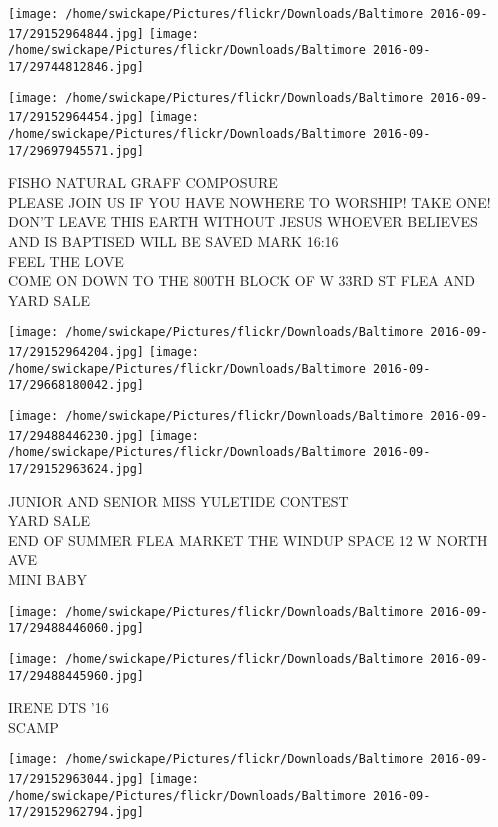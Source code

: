 \documentclass[10pt,letterpaper]{article}
\begin{document}
\texttt{[image: /home/swickape/Pictures/flickr/Downloads/Baltimore 2016-09-17/29152964844.jpg]}
\texttt{[image: /home/swickape/Pictures/flickr/Downloads/Baltimore 2016-09-17/29744812846.jpg]}

\texttt{[image: /home/swickape/Pictures/flickr/Downloads/Baltimore 2016-09-17/29152964454.jpg]}
\texttt{[image: /home/swickape/Pictures/flickr/Downloads/Baltimore 2016-09-17/29697945571.jpg]}

FISHO NATURAL GRAFF COMPOSURE\\
PLEASE JOIN US IF YOU HAVE NOWHERE TO WORSHIP!  TAKE ONE!  DON'T LEAVE THIS EARTH WITHOUT JESUS WHOEVER BELIEVES AND IS BAPTISED WILL BE SAVED MARK 16:16\\
FEEL THE LOVE\\
COME ON DOWN TO THE 800TH BLOCK OF W 33RD ST FLEA AND YARD SALE\\
\pagebreak

\texttt{[image: /home/swickape/Pictures/flickr/Downloads/Baltimore 2016-09-17/29152964204.jpg]}
\texttt{[image: /home/swickape/Pictures/flickr/Downloads/Baltimore 2016-09-17/29668180042.jpg]}

\texttt{[image: /home/swickape/Pictures/flickr/Downloads/Baltimore 2016-09-17/29488446230.jpg]}
\texttt{[image: /home/swickape/Pictures/flickr/Downloads/Baltimore 2016-09-17/29152963624.jpg]}

JUNIOR AND SENIOR MISS YULETIDE CONTEST\\
YARD SALE\\
END OF SUMMER FLEA MARKET THE WINDUP SPACE 12 W NORTH AVE\\
MINI BABY\\
\pagebreak

\texttt{[image: /home/swickape/Pictures/flickr/Downloads/Baltimore 2016-09-17/29488446060.jpg]}

\vspace{0.25in}
\texttt{[image: /home/swickape/Pictures/flickr/Downloads/Baltimore 2016-09-17/29488445960.jpg]}

IRENE DTS '16\\
SCAMP\\
\pagebreak

\texttt{[image: /home/swickape/Pictures/flickr/Downloads/Baltimore 2016-09-17/29152963044.jpg]}
\texttt{[image: /home/swickape/Pictures/flickr/Downloads/Baltimore 2016-09-17/29152962794.jpg]}
\end{document}
